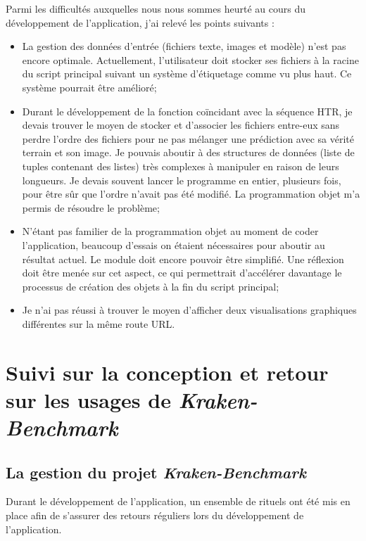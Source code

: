 Parmi les difficultés auxquelles nous nous sommes heurté au cours du développement de l'application, j'ai relevé les points suivants :

\begin{itemize}
    \item La gestion des données d'entrée (fichiers texte, images et modèle) n'est pas encore optimale. Actuellement, l'utilisateur doit stocker ses fichiers à la racine du script principal suivant un système d'étiquetage comme vu plus haut. Ce système pourrait être amélioré;
    \item Durant le développement de la fonction coïncidant avec la séquence HTR, je devais trouver le moyen de stocker et d'associer les fichiers entre-eux sans perdre l'ordre des fichiers pour ne pas mélanger une prédiction avec sa vérité terrain et son image. Je pouvais aboutir à des structures de données (liste de tuples contenant des listes) très complexes à manipuler en raison de leurs longueurs. Je devais souvent lancer le programme en entier, plusieurs fois, pour être sûr que l'ordre n'avait pas été modifié. La programmation objet m'a permis de résoudre le problème;
    \item N'étant pas familier de la programmation objet au moment de coder l'application, beaucoup d'essais on étaient nécessaires pour aboutir au résultat actuel. Le module  doit encore pouvoir être simplifié. Une réflexion doit être menée sur cet aspect, ce qui permettrait d'accélérer davantage le processus de création des objets à la fin du script principal;
    \item Je n'ai pas réussi à trouver le moyen d'afficher deux visualisations graphiques différentes sur la même route URL. 
\end{itemize}

\section{Suivi sur la conception et retour sur les usages de \textit{Kraken-Benchmark}}

\subsection{La gestion du projet \textit{Kraken-Benchmark}}

Durant le développement de l'application, un ensemble de rituels ont été mis en place afin de s'assurer des retours réguliers lors du développement de l'application.\\

